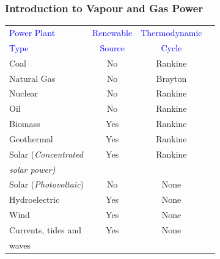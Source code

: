 \documentclass[10pt,compress]{beamer}
\begin{document}
\begin{frame}
 \frametitle{Introduction to Vapour and Gas Power}
    \begin{center}
     \begin{table}
       \begin{tabular}{l c c c}
    \hline
    \textcolor{blue}{Power Plant} & \textcolor{blue}{Renewable}  & \textcolor{blue}{Thermodynamic} \\
    \textcolor{blue}{Type}        & \textcolor{blue}{Source}     & \textcolor{blue}{Cycle}         \\
    \hline
      Coal                        &   No                         & Rankine  \\
      Natural Gas                 &   No                         & Brayton  \\
      Nuclear                     &   No                         & Rankine  \\
      Oil                         &   No                         & Rankine  \\
      Biomass                     &   Yes                        & Rankine  \\
      Geothermal                  &   Yes                        & Rankine  \\
      Solar ({\it Concentrated}   &   Yes                        & Rankine  \\
       {\it solar power)}         &                              &          \\
      Solar ({\it Photovoltaic})  &   No                         & None     \\
      Hydroelectric               &   Yes                        & None     \\
      Wind                        &   Yes                        & None     \\
      Currents, tides and         &   Yes                        & None     \\
      waves                       &                              &          \\
      \end{tabular}
     \end{table}
    \end{center}
\end{frame}
\end{document}
